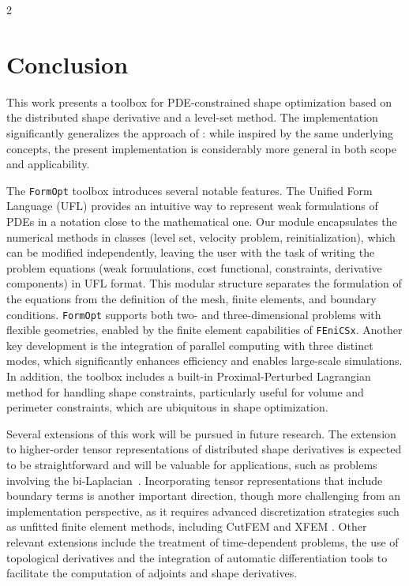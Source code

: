 \documentclass[a4paper, oneside]{article}
\newcommand{\fopt}{\texttt{FormOpt} }
\newcommand{\fx}{\texttt{FEniCSx}}
\begin{document}
\begin{multicols}{2}
\section{Conclusion}

This work presents a toolbox for PDE-constrained shape optimization based on the distributed shape derivative and a level-set method.
The implementation significantly generalizes the approach of \cite{MR3843884}: while inspired by the same underlying concepts, the present implementation is considerably more general in both scope and applicability.

The \fopt toolbox introduces several notable features.
The Unified Form Language (UFL) provides an intuitive way to represent weak formulations of PDEs in a notation close to the mathematical one. 
Our module encapsulates the numerical methods in classes
(level set, velocity problem, reinitialization),
which can be modified independently,
leaving the user with the task of writing the problem equations
(weak formulations, cost functional, constraints, derivative components)
in UFL format.
This modular structure separates the formulation of the equations from the definition of the mesh, finite elements, and boundary conditions.
\fopt  supports both two- and three-dimensional problems with flexible geometries, enabled by the finite element capabilities of \fx. Another key development is the integration of parallel computing with three distinct modes, which significantly enhances efficiency and enables large-scale simulations. In addition, the toolbox includes a built-in Proximal-Perturbed Lagrangian method for handling shape constraints, particularly useful for volume and perimeter constraints, which are ubiquitous in shape optimization.

Several extensions of this work will be pursued in future research. The extension to higher-order tensor representations of distributed shape derivatives is expected to be straightforward and will be valuable for applications, such as problems involving the bi-Laplacian~\cite{LL2024}. Incorporating tensor representations that include boundary terms is another important direction, though more challenging from an implementation perspective, as it requires advanced discretization strategies such as unfitted finite element methods, including CutFEM \cite{Burman1} and XFEM \cite{belytschko2001arbitrary}. 
Other relevant extensions include the treatment of time-dependent problems, the use of topological derivatives \cite{MR4916810,Novotny2013} and the integration of automatic differentiation tools \cite{Allaire2024,BLAUTH2023101577,MR4233697,Ham2019,Paganini2021} to facilitate the computation of adjoints and shape derivatives.


\end{multicols} 



\end{document}
